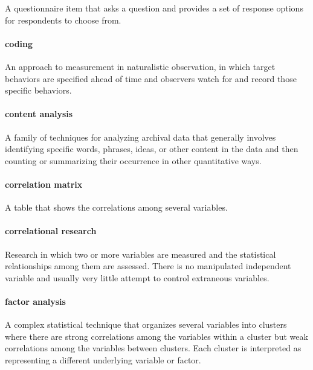 \documentclass[
]{krantz}
\begin{document}
A questionnaire item that asks a question and provides a set of response options for respondents to choose from.

\paragraph*{coding}\label{coding}

An approach to measurement in naturalistic observation, in which target behaviors are specified ahead of time and observers watch for and record those specific behaviors.

\paragraph*{content analysis}\label{content-analysis}

A family of techniques for analyzing archival data that generally involves identifying specific words, phrases, ideas, or other content in the data and then counting or summarizing their occurrence in other quantitative ways.

\paragraph*{correlation matrix}\label{correlation-matrix}

A table that shows the correlations among several variables.

\paragraph*{correlational research}\label{correlational-research-1}

Research in which two or more variables are measured and the statistical relationships among them are assessed. There is no manipulated independent variable and usually very little attempt to control extraneous variables.

\paragraph*{factor analysis}\label{factor-analysis}

A complex statistical technique that organizes several variables into clusters where there are strong correlations among the variables within a cluster but weak correlations among the variables between clusters. Each cluster is interpreted as representing a different underlying variable or factor.
\end{document}
